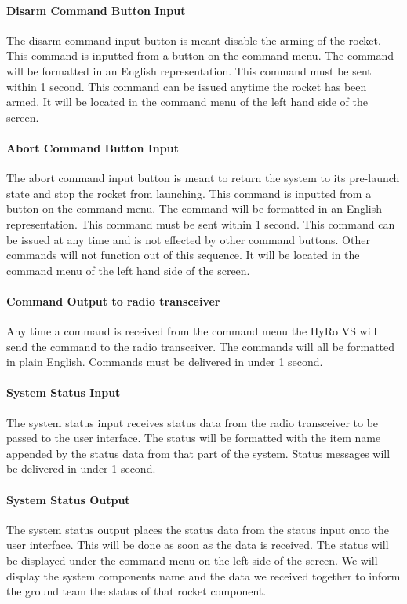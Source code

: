 \documentclass[10pt,draftclsnofoot,onecolumn,compsoc]{IEEEtran}
\begin{document}
\paragraph{\bf Disarm Command Button Input}
The disarm command input button is meant disable the arming of the rocket. This command is inputted from a button on the command menu. The command will be formatted in an English representation.  This command must be sent within 1 second. This command can be issued anytime the rocket has been armed. It will be located in the command menu of the left hand side of the screen.
\paragraph{\bf Abort Command Button Input}
The abort command input button is meant to return the system to its pre-launch state and stop the rocket from launching. This command is inputted from a button on the command menu. The command will be formatted in an English representation.  This command must be sent within 1 second. This command can be issued at any time and is not effected by other command buttons. Other commands will not function out of this sequence. It will be located in the command menu of the left hand side of the screen.
\paragraph{\bf Command Output to radio transceiver}
	Any time a command is received from the command menu the HyRo VS will send the command to the radio transceiver. The commands will all be formatted in plain English. Commands must be delivered in under 1 second.
\paragraph{\bf System Status Input}
	The system status input receives status data from the radio transceiver to be passed to the user interface. The status will be formatted with the item name appended by the status data from that part of the system. Status messages will be delivered in under 1 second. 
\paragraph{\bf System Status Output}
The system status output places the status data from the status input onto the user interface. This will be done as soon as the data is received. The status will be displayed under the command menu on the left side of the screen. We will display the system components name and the data we received together to inform the ground team the status of that rocket component.
\end{document}
